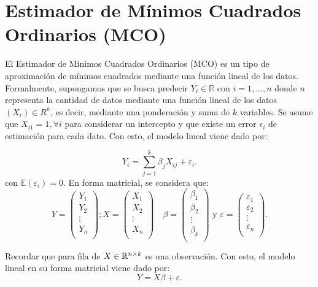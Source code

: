\section{Estimador de Mínimos Cuadrados Ordinarios (MCO)}

El Estimador de Mínimos Cuadrados Ordinarios (MCO) es un tipo de aproximación de mínimos cuadrados mediante una función lineal de los datos. Formalmente, supongamos que se busca predecir $Y_i\in\mathbb{R}$ con $i=1,...,n$ donde $n$ representa la cantidad de datos mediante una función lineal de los datos $(X_i) \in R^{k}$, es decir, mediante una ponderación y suma de $k$ variables. Se asume que $X_{i1}=1,\forall i$ para considerar un intercepto y que existe un error $\epsilon_i$ de estimación para cada dato. Con esto, el modelo lineal viene dado por:

$$
Y_i= \sum_{j=1}^{k}\beta_j X_{ij} + \varepsilon_i.
$$
con $\mathbb{E}(\varepsilon_i)=0$. En forma matricial, se considera que:
$$
Y=\begin{pmatrix}
Y_1 \\
Y_2\\
\vdots\\
Y_n\\
\end{pmatrix} ; 
X= \begin{pmatrix}
X_1 \\
X_2\\
\vdots\\
X_n\\
\end{pmatrix}
\quad
\beta= \begin{pmatrix}
\beta_1 \\
\beta_2\\
\vdots\\
\beta_k\\
\end{pmatrix} \text{ y }
\varepsilon= \begin{pmatrix}
\varepsilon_1 \\
\varepsilon_2\\
\vdots\\
\varepsilon_n\\
\end{pmatrix}.
$$

Recordar que para fila de $X\in {\mathbb R}^{n \times k }$ es una observación. Con esto, el modelo lineal en su forma matricial viene dado por: 
$$
Y=X\beta + \varepsilon.
$$

